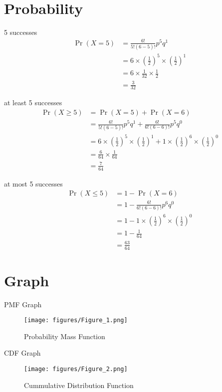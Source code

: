 \documentclass{beamer}
\providecommand{\pr}[1]{\ensuremath{\Pr\left(#1\right)}}
\providecommand{\pr}[1]{\ensuremath{\Pr\left(#1\right)}}
\providecommand{\brak}[1]{\ensuremath{\left(#1\right)}}
\begin{document}
\section{Probability}
\begin{frame}{5 successes}
\begin{align}
    \pr{X=5} &= \frac{6!}{5! (6-5)!}p^5q^{1} \\
    &= 6 \times \brak{\frac{1}{2}}^{5} \times \brak{\frac{1}{2}}^{1}\\
    &= 6 \times \frac{1}{32} \times \frac{1}{2}\\
    &= \frac{3}{32}
\end{align}

\end{frame}
\begin{frame}{at least 5 successes}
\begin{align}
    \pr{X\geq5} &= \pr{X=5} + \pr{X=6}\\
    &= \frac{6!}{5! (6-5)!}p^5q^{1} + \frac{6!}{6! (6-6)!}p^5q^{0}\\
    &= 6 \times \brak{\frac{1}{2}}^{5} \times \brak{\frac{1}{2}}^{1} + 1 \times \brak{\frac{1}{2}}^{6} \times \brak{\frac{1}{2}}^{0}\\
    &= \frac{6}{64} \times \frac{1}{64}\\
    &= \frac{7}{64}
\end{align}

\end{frame}
\begin{frame}{at most 5 successes}
\begin{align}
    \pr{X\leq5} &= 1 - \pr{X=6}\\
    &= 1 - \frac{6!}{6! (6-6)!}p^6q^{0} \\
    &= 1 -  1 \times \brak{\frac{1}{2}}^{6} \times \brak{\frac{1}{2}}^{0}\\
    &= 1 -  \frac{1}{64}\\
    &= \frac{63}{64}
\end{align}
\end{frame}

\section{Graph}
\begin{frame}{PMF Graph}
\begin{figure}[!ht]
		\centering
		\texttt{[image: figures/Figure\_1.png]}
		\caption{Probability Mass Function}
		\label{fig1}
	\end{figure}
\end{frame}

\begin{frame}{CDF Graph}
\begin{figure}[!ht]
		\centering
		\texttt{[image: figures/Figure\_2.png]}
		\caption{Cummulative Distribution Function}
		\label{fig1}
	\end{figure}
\end{frame}
\end{document}
